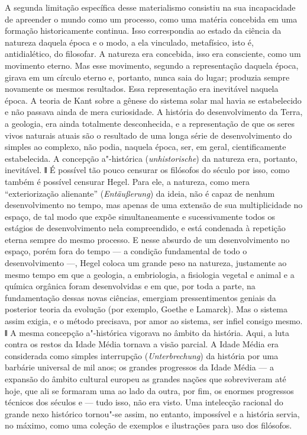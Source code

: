 A segunda limitação específica desse materialismo consistiu na sua
incapacidade de apreender o mundo como um processo, como uma matéria
concebida em uma formação historicamente continua. Isso correspondia ao
estado da ciência da natureza daquela época e o modo, a ela vinculado,
metafísico, isto é, antidialético, do filosofar. A natureza era
concebida, isso era consciente, como um movimento eterno. Mas esse
movimento, segundo a representação daquela época, girava em um círculo
eterno e, portanto, nunca saia do lugar; produzia sempre novamente os
mesmos resultados. Essa representação era inevitável naquela época. A
teoria
de Kant sobre
a gênese do sistema solar mal havia se estabelecido e não passava ainda
de mera curiosidade. A história do desenvolvimento da Terra, a geologia,
era ainda totalmente desconhecida, e a representação de que os seres
vivos naturais atuais são o resultado de uma longa série de
desenvolvimento do simples ao complexo, não podia, naquela época, ser,
em geral, cientificamente estabelecida. A concepção a"-histórica
(\emph{unhistorische}) da natureza era, portanto, inevitável. \textbf{ǁ}
É possível tão pouco censurar os filósofos do século  por isso,
como também é possível censurar Hegel. Para ele, a natureza, como mera
``exteriorização alienante'' (\emph{Entäußerung}) da ideia, não é capaz
de nenhum desenvolvimento no tempo, mas apenas de uma extensão de sua
multiplicidade no espaço, de tal modo que expõe simultaneamente e
sucessivamente todos os estágios de desenvolvimento nela compreendido, e
está condenada à repetição eterna sempre do mesmo processo. E nesse
absurdo de um desenvolvimento no espaço, porém fora do tempo --- a
condição fundamental de todo o desenvolvimento ---,
Hegel coloca
um grande peso na natureza, justamente ao mesmo tempo em que a geologia,
a embriologia, a fisiologia vegetal e animal e a química orgânica foram
desenvolvidas e em que, por toda a parte, na fundamentação dessas novas
ciências, emergiam pressentimentos geniais da posterior teoria da
evolução (por
exemplo, Goethe e Lamarck).
Mas o sistema assim exigia, e o método precisava, por amor ao sistema,
ser infiel consigo mesmo. \textbf{ǁ} A mesma concepção a"-histórica
vigorava no âmbito da história. Aqui, a luta contra os restos da Idade
Média tornava a visão parcial. A Idade Média era considerada como
simples interrupção (\emph{Unterbrechung}) da história por uma barbárie
universal de mil anos; os grandes progressos da Idade Média --- a expansão
do âmbito cultural europeu as grandes nações que sobreviveram até hoje,
que ali se formaram uma ao lado da outra, por fim, os enormes progressos
técnicos dos séculos  e  --- tudo isso, não era visto. Uma intelecção
racional do grande nexo histórico tornou"-se assim, no entanto,
impossível e a história servia, no máximo, como uma coleção de exemplos
e ilustrações para uso dos filósofos.

